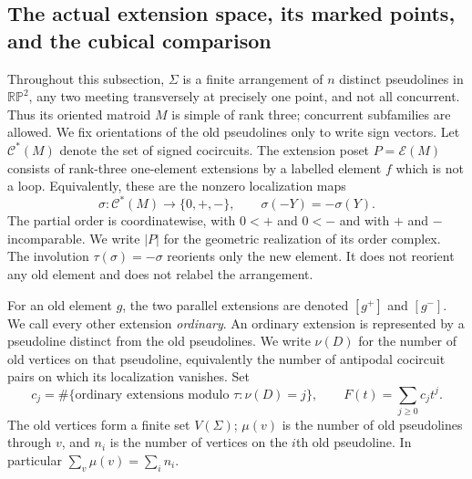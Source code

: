 \subsection{The actual extension space, its marked points, and the cubical comparison}

Throughout this subsection, $\Sigma$ is a finite arrangement of $n$ distinct
pseudolines in $\mathbb {RP}^{2}$, any two meeting transversely at precisely one
point, and not all concurrent. Thus its oriented matroid $M$ is simple of rank
three; concurrent subfamilies are allowed. We fix orientations of the old
pseudolines only to write sign vectors. Let $\mathcal C^*(M)$ denote the set of
signed cocircuits. The extension poset $P=\mathcal E(M)$ consists of rank-three
one-element extensions by a labelled element $f$ which is not a loop. Equivalently,
these are the nonzero localization maps
\[
 \sigma:\mathcal C^*(M)\longrightarrow\{0,+,-\},\qquad
 \sigma(-Y)=-\sigma(Y).
\]
The partial order is coordinatewise, with $0<+$ and $0<-$ and with $+$ and $-$
incomparable. We write $|P|$ for the geometric realization of its order complex.
The involution $\tau(\sigma)=-\sigma$ reorients only the new element. It does not
reorient any old element and does not relabel the arrangement.

For an old element $g$, the two parallel extensions are denoted $[g^+]$ and
$[g^-]$. We call every other extension \emph{ordinary}. An ordinary extension
is represented by a pseudoline distinct from the old pseudolines. We write
$\nu(D)$ for the number of old vertices on that pseudoline, equivalently the
number of antipodal cocircuit pairs on which its localization vanishes. Set
\[
 c_j=\#\{\text{ordinary extensions modulo }\tau:\nu(D)=j\},
 \qquad F(t)=\sum_{j\geq0}c_jt^j.
\]
The old vertices form a finite set $V(\Sigma)$; $\mu(v)$ is the number of old
pseudolines through $v$, and $n_i$ is the number of vertices on the $i$th old
pseudoline. In particular $\sum_v\mu(v)=\sum_i n_i$.

